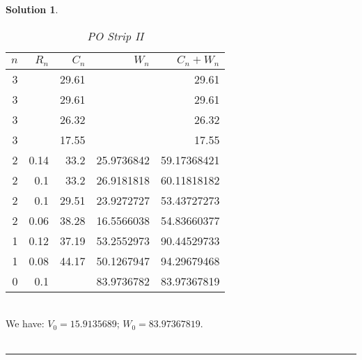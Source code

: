 \documentclass[a4paper, 10pt]{article}
\renewcommand{\arraystretch}{1.4}
\theoremstyle{definition}
\theoremstyle{hSol}
\newtheorem*{solution}{Solution}
\begin{document}
\begin{solution}
\begin{table}[H]
  \centering
  \caption{\textit{PO Strip II}}
  \vspace{-7pt}
  \def\arraystretch{1.15}
  \begin{tabular}{|r|rrrr|}
  \hline
  $n$ & $R_n$ & $C_n$ & $W_n$ & $C_n+W_n$\\
    \hline
    3     &       & 29.61 &       & 29.61 \\
    3     &       & 29.61 &       & 29.61 \\
    3     &       & 26.32 &       & 26.32 \\
    3     &       & 17.55 &       & 17.55 \\
    \hline
    2     & 0.14  & 33.2  & 25.9736842 & 59.17368421 \\
    2     & 0.1   & 33.2  & 26.9181818 & 60.11818182 \\
    2     & 0.1   & 29.51 & 23.9272727 & 53.43727273 \\
    2     & 0.06  & 38.28 & 16.5566038 & 54.83660377 \\
    \hline
    1     & 0.12  & 37.19 & 53.2552973 & 90.44529733 \\
    1     & 0.08  & 44.17 & 50.1267947 & 94.29679468 \\
    \hline
    0     & 0.1   &       & 83.9736782 & 83.97367819 \\
    \hline
    \end{tabular}%
  \label{tab:addlabel}%
\end{table}%
~\\
We have: $V_0=  15.9135689 $; $W_0 = 83.97367819$.\\
~\\



\end{solution}

\noindent\rule{16cm}{0.4pt}
\end{document}
